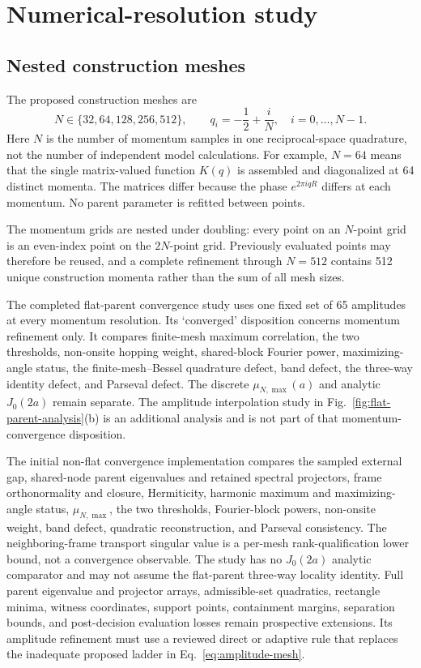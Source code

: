 \documentclass[11pt]{article}
\begin{document}
\section{Numerical-resolution study}

\subsection{Nested construction meshes}

The proposed construction meshes are
\begin{equation}
 N\in\{32,64,128,256,512\},
 \qquad
 q_i=-\frac12+\frac{i}{N},
 \quad i=0,\ldots,N-1.
 \label{eq:construction-meshes}
\end{equation}
Here $N$ is the number of momentum samples in one reciprocal-space quadrature, not the
number of independent model calculations. For example, $N=64$ means that the single
matrix-valued function $K(q)$ is assembled and diagonalized at 64 distinct momenta. The
matrices differ because the phase $e^{2\pi iqR}$ differs at each momentum. No parent
parameter is refitted between points.

The momentum grids are nested under doubling: every point on an $N$-point grid is an
even-index point on the $2N$-point grid. Previously evaluated points may therefore be
reused, and a complete refinement through $N=512$ contains 512 unique construction
momenta rather than the sum of all mesh sizes.

The completed flat-parent convergence study uses one fixed set of 65 amplitudes at every
momentum resolution. Its `converged' disposition concerns momentum refinement only. It
compares finite-mesh maximum correlation, the two thresholds, non-onsite hopping weight,
shared-block Fourier power, maximizing-angle status, the finite-mesh--Bessel quadrature
defect, band defect, the three-way identity defect, and Parseval defect. The discrete
$\mu_{N,\max}(a)$ and analytic $J_0(2a)$ remain separate. The amplitude interpolation
study in Fig.~\ref{fig:flat-parent-analysis}(b) is an additional analysis and is not part
of that momentum-convergence disposition.

The initial non-flat convergence implementation compares the sampled external gap,
shared-node parent eigenvalues and retained spectral projectors, frame orthonormality and
closure, Hermiticity, harmonic maximum and maximizing-angle status, $\mu_{N,\max}$, the
two thresholds, Fourier-block powers, non-onsite weight, band defect, quadratic
reconstruction, and Parseval consistency. The neighboring-frame transport singular
value is a per-mesh rank-qualification lower bound, not a convergence observable. The
study has no $J_0(2a)$ analytic comparator and may not assume the flat-parent three-way
locality identity. Full parent eigenvalue and projector arrays, admissible-set
quadratics, rectangle minima, witness coordinates,
support points, containment margins, separation bounds, and post-decision evaluation
losses remain prospective extensions. Its amplitude refinement must use a reviewed
direct or adaptive rule that replaces the inadequate proposed ladder in
Eq.~\eqref{eq:amplitude-mesh}.
\end{document}
